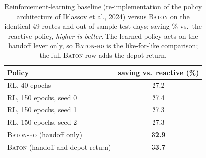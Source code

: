 \begin{table}[t]
\caption{Reinforcement-learning baseline (re-implementation of the policy
architecture of Iklassov et al., 2024) versus \textsc{Baton} on the
identical 49 routes and out-of-sample test days; saving \% vs.\ the
reactive policy, \emph{higher is better}. The learned policy acts on the
handoff lever only, so \textsc{Baton-ho} is the like-for-like
comparison; the full \textsc{Baton} row adds the depot return.}
\label{tab:rl}
\centering
\begin{tabular}{l c}
\toprule
Policy & saving vs.\ reactive (\%) \\
\midrule
RL, 40 epochs & 27.2 \\
RL, 150 epochs, seed 0 & 27.4 \\
RL, 150 epochs, seed 1 & 27.3 \\
RL, 150 epochs, seed 2 & 27.3 \\
\midrule
\textsc{Baton-ho} (handoff only) & \textbf{32.9} \\
\textsc{Baton} (handoff and depot return) & \textbf{33.7} \\
\bottomrule
\end{tabular}
\end{table}
